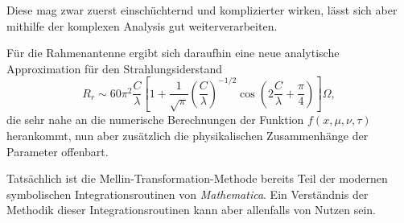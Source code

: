Diese mag zwar zuerst einschüchternd und komplizierter wirken, lässt 
sich aber mithilfe der komplexen Analysis gut weiterverarbeiten.

Für die Rahmenantenne ergibt sich daraufhin eine neue analytische 
Approximation für den Strahlungsiderstand 
\[
    R_r \sim 60\pi^2 \frac{C}{\lambda}
    \left[1+\frac{1}{\sqrt{\pi}}\left(\frac{C}{\lambda}\right)^{-1/2} 
    \cos\left(2\frac{C}{\lambda}+\frac{\pi}{4}\right)\right] \Omega
    ,
\]
die sehr nahe an die numerische Berechnungen der Funktion $f(x, \mu, \nu, \tau)$ 
herankommt, nun aber zusätzlich die physikalischen Zusammenhänge der 
Parameter offenbart.
\medskip

Tatsächlich ist die Mellin-Transformation-Methode bereits Teil der  
modernen symbolischen Integrationsroutinen von {\em Mathematica}.
Ein Verständnis der Methodik dieser Integrationsroutinen kann aber
allenfalls von Nutzen sein.


